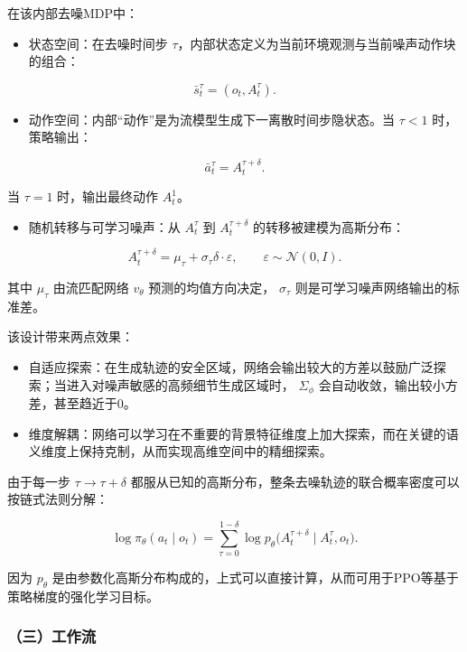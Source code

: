 在该内部去噪MDP中：

\begin{itemize}
\tightlist
\item
  状态空间：在去噪时间步 \(\tau\)，内部状态定义为当前环境观测与当前噪声动作块的组合：
\end{itemize}

\[
\bar{s}_t^\tau=(o_t,A_t^\tau).
\]

\begin{itemize}
\tightlist
\item
  动作空间：内部``动作''是为流模型生成下一离散时间步隐状态。当 \(\tau<1\) 时，策略输出：
\end{itemize}

\[
\bar{a}_t^\tau=A_t^{\tau+\delta}.
\]

当 \(\tau=1\) 时，输出最终动作 \(A_t^1\)。

\begin{itemize}
\tightlist
\item
  随机转移与可学习噪声：从 \(A_t^\tau\) 到 \(A_t^{\tau+\delta}\) 的转移被建模为高斯分布：
\end{itemize}

\[
A_t^{\tau+\delta}=\mu_\tau+\sigma_\tau\delta\cdot\varepsilon,
\qquad \varepsilon\sim\mathcal{N}(0,I).
\]

其中 \(\mu_\tau\) 由流匹配网络 \(v_\theta\) 预测的均值方向决定， \(\sigma_\tau\) 则是可学习噪声网络输出的标准差。

该设计带来两点效果：

\begin{itemize}
\tightlist
\item
  自适应探索：在生成轨迹的安全区域，网络会输出较大的方差以鼓励广泛探索；当进入对噪声敏感的高频细节生成区域时， \(\Sigma_\phi\) 会自动收敛，输出较小方差，甚至趋近于0。
\item
  维度解耦：网络可以学习在不重要的背景特征维度上加大探索，而在关键的语义维度上保持克制，从而实现高维空间中的精细探索。
\end{itemize}

由于每一步 \(\tau\to\tau+\delta\) 都服从已知的高斯分布，整条去噪轨迹的联合概率密度可以按链式法则分解：

\[
\log\pi_\theta(a_t\mid o_t)=\sum_{\tau=0}^{1-\delta}\log p_\theta
\bigl(A_t^{\tau+\delta}\mid A_t^\tau,o_t\bigr).
\]

因为 \(p_\theta\) 是由参数化高斯分布构成的，上式可以直接计算，从而可用于PPO等基于策略梯度的强化学习目标。

\hypertarget{ux4e09ux5de5ux4f5cux6d41}{%
\subsubsection{（三）工作流}\label{ux4e09ux5de5ux4f5cux6d41}}

